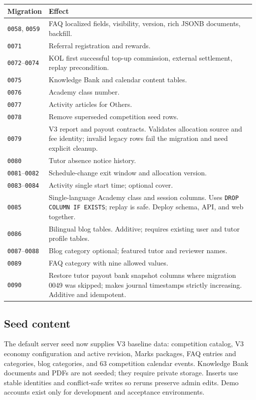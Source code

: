 \documentclass[11pt,a4paper]{article}
\newcommand{\code}[1]{\texttt{#1}}
\begin{document}
\begin{longtable}{@{}L{2.3cm}L{11.1cm}@{}}
\toprule
\textbf{Migration} & \textbf{Effect} \\
\midrule
\endhead
\code{0058}, \code{0059} & FAQ localized fields, visibility, version, rich JSONB documents, backfill. \\
\code{0071} & Referral registration and rewards. \\
\code{0072}--\code{0074} & KOL first successful top-up commission, external settlement, replay precondition. \\
\code{0075} & Knowledge Bank and calendar content tables. \\
\code{0076} & Academy class number. \\
\code{0077} & Activity articles for Others. \\
\code{0078} & Remove superseded competition seed rows. \\
\code{0079} & V3 report and payout contracts. Validates allocation source and fee identity; invalid legacy rows fail the migration and need explicit cleanup. \\
\code{0080} & Tutor absence notice history. \\
\code{0081}--\code{0082} & Schedule-change exit window and allocation version. \\
\code{0083}--\code{0084} & Activity single start time; optional cover. \\
\code{0085} & Single-language Academy class and session columns. Uses \code{DROP COLUMN IF EXISTS}; replay is safe. Deploy schema, API, and web together. \\
\code{0086} & Bilingual blog tables. Additive; requires existing user and tutor profile tables. \\
\code{0087}--\code{0088} & Blog category optional; featured tutor and reviewer names. \\
\code{0089} & FAQ category with nine allowed values. \\
\code{0090} & Restore tutor payout bank snapshot columns where migration 0049 was skipped; makes journal timestamps strictly increasing. Additive and idempotent. \\
\bottomrule
\end{longtable}

\subsection{Seed content}

The default server seed now supplies V3 baseline data: competition catalog, V3 economy configuration and active revision, Marks packages, FAQ entries and categories, blog categories, and 63 competition calendar events. Knowledge Bank documents and PDFs are not seeded; they require private storage. Inserts use stable identities and conflict-safe writes so reruns preserve admin edits. Demo accounts exist only for development and acceptance environments.
\end{document}
